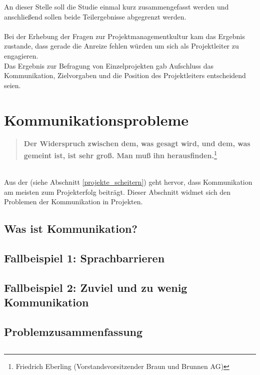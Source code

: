\documentclass[12pt]{scrartcl}
\begin{document}
An dieser Stelle soll die Studie einmal kurz zusammengefasst werden und anschließend sollen beide Teilergebnisse abgegrenzt werden. \\
\\
Bei der Erhebung der Fragen zur Projektmanagementkultur kam das Ergebnis zustande, dass gerade die Anreize fehlen würden um sich als Projektleiter zu engagieren. \\
Das Ergebnis zur Befragung von Einzelprojekten gab Aufschluss das Kommunikation, Zielvorgaben und die Position des Projektleiters entscheidend seien.

\pagebreak
\section{Kommunikationsprobleme}

\begin{quote}
\colorbox{blue!5}{\textbf{Der Widerspruch zwischen dem, was gesagt wird, und dem, was gemeint ist, ist sehr groß. Man muß ihn herausfinden.}}\footnote{Friedrich Eberling (Vorstandsvorsitzender Braun und Brunnen AG)}
\end{quote}
\ \\
Aus der \cite{GPM_Studie_2008} (siehe Abschnitt \ref{projekte_scheitern}) geht hervor, dass Kommunikation am meisten zum Projekterfolg beiträgt. Dieser Abschnitt widmet sich den Problemen der Kommunikation in Projekten. 

\subsection{Was ist Kommunikation?}

\subsection{Fallbeispiel 1: Sprachbarrieren}
\subsection{Fallbeispiel 2: Zuviel und zu wenig Kommunikation}

\subsection{Problemzusammenfassung}
\subsection{}
\end{document}
